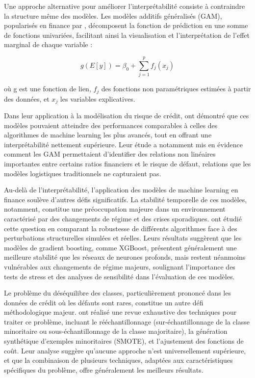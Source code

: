 Une approche alternative pour améliorer l'interprétabilité consiste à contraindre la structure même des modèles. Les modèles additifs généralisés (GAM), popularisés en finance par \citet{caruana2015}, décomposent la fonction de prédiction en une somme de fonctions univariées, facilitant ainsi la visualisation et l'interprétation de l'effet marginal de chaque variable :

\begin{equation}
g(E[y]) = \beta_0 + \sum_{j=1}^p f_j(x_j)
\end{equation}

où g est une fonction de lien, $f_j$ des fonctions non paramétriques estimées à partir des données, et $x_j$ les variables explicatives.

Dans leur application à la modélisation du risque de crédit, \citet{dumitrescu2022} ont démontré que ces modèles pouvaient atteindre des performances comparables à celles des algorithmes de machine learning les plus avancés, tout en offrant une interprétabilité nettement supérieure. Leur étude a notamment mis en évidence comment les GAM permettaient d'identifier des relations non linéaires importantes entre certains ratios financiers et le risque de défaut, relations que les modèles logistiques traditionnels ne capturaient pas.

Au-delà de l'interprétabilité, l'application des modèles de machine learning en finance soulève d'autres défis significatifs. La stabilité temporelle de ces modèles, notamment, constitue une préoccupation majeure dans un environnement caractérisé par des changements de régime et des crises sporadiques. \citet{moscatelli2020} ont étudié cette question en comparant la robustesse de différents algorithmes face à des perturbations structurelles simulées et réelles. Leurs résultats suggèrent que les modèles de gradient boosting, comme XGBoost, présentent généralement une meilleure stabilité que les réseaux de neurones profonds, mais restent néanmoins vulnérables aux changements de régime majeurs, soulignant l'importance des tests de stress et des analyses de sensibilité dans l'évaluation de ces modèles.

Le problème du déséquilibre des classes, particulièrement prononcé dans les données de crédit où les défauts sont rares, constitue un autre défi méthodologique majeur. \citet{fernandez2018} ont réalisé une revue exhaustive des techniques pour traiter ce problème, incluant le rééchantillonnage (sur-échantillonnage de la classe minoritaire ou sous-échantillonnage de la classe majoritaire), la génération synthétique d'exemples minoritaires (SMOTE), et l'ajustement des fonctions de coût. Leur analyse suggère qu'aucune approche n'est universellement supérieure, et que la combinaison de plusieurs techniques, adaptées aux caractéristiques spécifiques du problème, offre généralement les meilleurs résultats.

